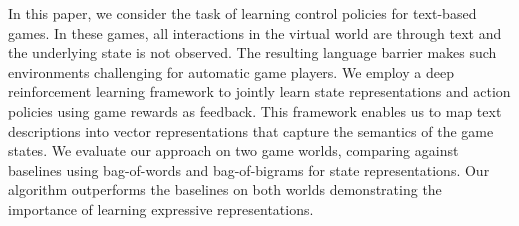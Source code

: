 In this paper, we consider the task of learning control policies for text-based games. In these games, all interactions in the virtual world are through text and the underlying state is not observed. The resulting language barrier makes such environments challenging for automatic game players. We employ a deep reinforcement learning framework to jointly learn state representations and action policies using game rewards as feedback. This framework enables us to map text descriptions into vector representations that capture the semantics of the game states. We evaluate our approach on two game worlds, comparing against baselines using bag-of-words and bag-of-bigrams for state representations. Our algorithm outperforms the baselines on both worlds demonstrating the importance of learning expressive representations.

